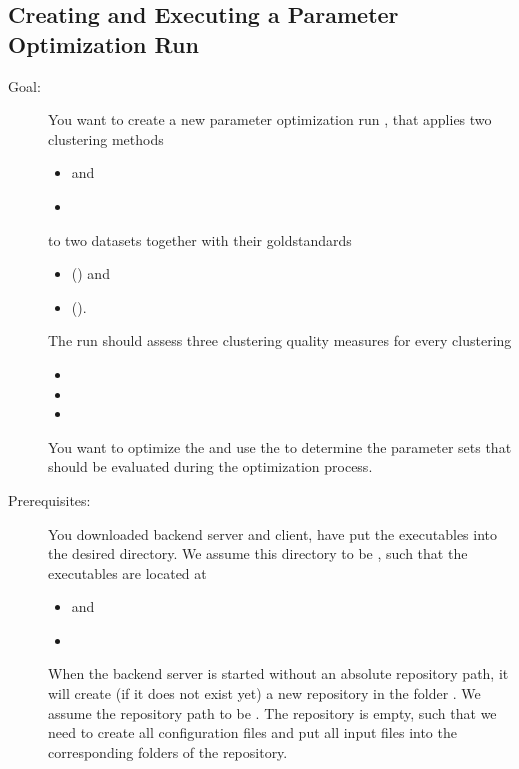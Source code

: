 	\subsection{Creating and Executing a Parameter Optimization Run}
	\begin{description}		
	\item[Goal:] You want to create a new parameter optimization run , that applies two clustering methods
	\begin{itemize}
		\item {} and 	
		\item {}
\end{itemize}
to two datasets together with their goldstandards
	\begin{itemize}
		\item {} () and
		\item {} ().
	\end{itemize}
The run should assess three clustering quality measures for every clustering
	\begin{itemize}
		\item {}
		\item {}
		\item {}
	\end{itemize}
	
	You want to optimize the  and use the 
	 to determine the parameter sets that should be evaluated during the optimization process.
	 \item[Prerequisites:] You downloaded \clusteval backend server and client, have put the executables into the desired directory. We assume this directory to be , such that the executables are located at
	 
	 \begin{itemize}
		\item {} and 
		\item {}
	 \end{itemize} When the backend server is started without an absolute repository path, it will create (if it does not exist yet) a new repository in the folder . We assume the repository path to be .
	The repository is empty, such that we need to create all configuration files and put all input files into the corresponding folders of the repository.
	

\end{description}
